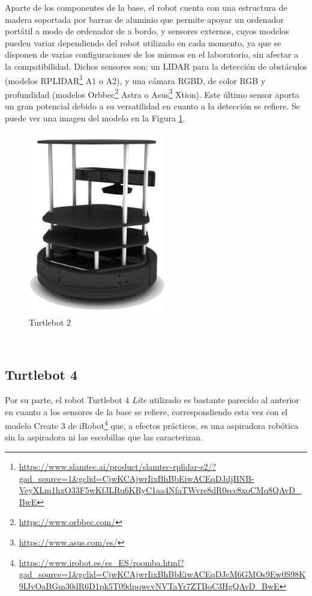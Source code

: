 Aparte de los componentes de la base, el robot cuenta con una estructura de
madera soportada por barras de aluminio que permite apoyar un ordenador
portátil a modo de ordenador de a bordo, y sensores externos, cuyos modelos
pueden variar dependiendo del robot utilizado en cada momento, ya que se
disponen de varias configuraciones de los mismos en el laboratorio, sin afectar
a la compatibilidad.
Dichos sensores son: un LIDAR para la detección de obstáculos (modelos
RPLIDAR\footnote{\url{https://www.slamtec.ai/product/slamtec-rplidar-s2/?gad_source=1&gclid=CjwKCAjwrIixBhBbEiwACEqDJdjBNB-VeyXLm1hxO33F5wKfJLRu6KRyC1aa4NfaTWvre8dR0scc8xoCMq8QAvD_BwE}}
A1 o A2), y una cámara RGBD, de color RGB y profundidad (modelos
Orbbec\footnote{\url{https://www.orbbec.com/}} Astra o
Asus\footnote{\url{https://www.asus.com/es/}} Xtion).
Este último sensor aporta un gran potencial debido a su versatilidad en cuanto a
la detección se refiere.
Se puede ver una imagen del modelo en la Figura \ref{fig:turtlebot2}.
\\

\begin{figure} [h!]
  \begin{center}
    \includegraphics[width=6cm]{figs/turtlebot2}
  \end{center}
  \caption{Turtlebot 2 \cite{turtlebot4}}
  \label{fig:turtlebot2}
\end{figure}\


\subsection{Turtlebot 4}
\label{sec:turtlebot4}

Por su parte, el robot Turtlebot 4 \textit{Lite} utilizado es bastante parecido
al anterior en cuanto a los sensores de la base se refiere, correspondiendo esta
vez con el modelo Create 3 de iRobot\footnote{
\url{https://www.irobot.es/es_ES/roomba.html?gad_source=1&gclid=CjwKCAjwrIixBhBbEiwACEqDJcM6GMOs9Ew0S98K9IJvOaBGm30dR6D1pk5T09dpqwcvNVTaYr7ZTBoC3HgQAvD_BwE}}
que, a efectos prácticos, es una aspiradora robótica sin la aspiradora ni
las escobillas que las caracterizan.
\\

